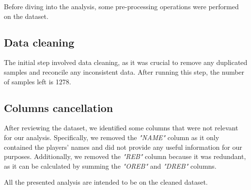 Before diving into the analysis, some pre-processing operations were performed on the dataset.

\subsection{Data cleaning}
The initial step involved data cleaning, as it was crucial to remove any duplicated samples and reconcile any inconsistent data.
After running this step, the number of samples left is 1278.

\subsection{Columns cancellation}
After reviewing the dataset, we identified some columns that were not relevant for our analysis. Specifically, we removed the \textit{"NAME"} column as it only contained the players' names and did not provide any useful information for our purposes. Additionally, we removed the \textit{"REB"} column because it was redundant, as it can be calculated by summing the \textit{"OREB"} and \textit{"DREB"} columns.

\noindent
All the presented analysis are intended to be on the cleaned dataset.
